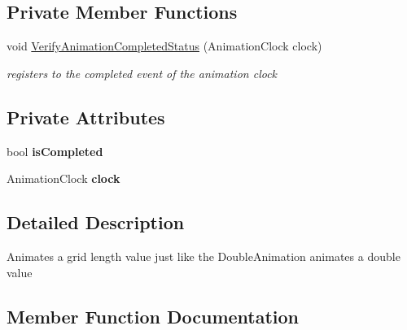 \subsection*{Private Member Functions}
\begin{DoxyCompactItemize}
\item 
void \mbox{\hyperlink{class_wpf_handler_1_1_u_i_1_1_animations_1_1_grid_length_animation_ad162ed70827b35263f8e39939a0dcdcd}{Verify\+Animation\+Completed\+Status}} (Animation\+Clock clock)
\begin{DoxyCompactList}\small\item\em registers to the completed event of the animation clock \end{DoxyCompactList}\end{DoxyCompactItemize}
\subsection*{Private Attributes}
\begin{DoxyCompactItemize}
\item 
\mbox{\label{class_wpf_handler_1_1_u_i_1_1_animations_1_1_grid_length_animation_a2a54b9ff4062d6c4ad47f28e137cfafe}} 
bool {\bfseries is\+Completed}
\item 
\mbox{\label{class_wpf_handler_1_1_u_i_1_1_animations_1_1_grid_length_animation_a2e79bc9b3aaa95f1f3d8e986b22d9540}} 
Animation\+Clock {\bfseries clock}
\end{DoxyCompactItemize}


\subsection{Detailed Description}
Animates a grid length value just like the Double\+Animation animates a double value 



\subsection{Member Function Documentation}
\mbox{\label{class_wpf_handler_1_1_u_i_1_1_animations_1_1_grid_length_animation_abf8dc83d562a5f43c9764c70d2d015f5}} 
